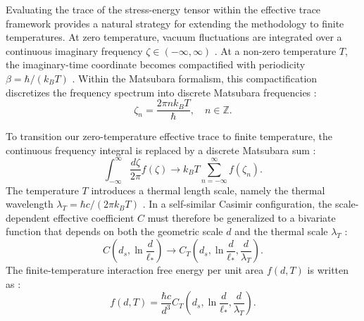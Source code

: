 \documentclass[12pt,letterpaper]{article}
\newcommand{\revision}[1]{#1}
\begin{document}
\revision{Evaluating the trace of the stress-energy tensor within the effective trace framework provides a natural strategy for extending the methodology to finite temperatures. At zero temperature, vacuum fluctuations are integrated over a continuous imaginary frequency $\zeta \in (-\infty, \infty)$ \cite{milton2016}. At a non-zero temperature $T$, the imaginary-time coordinate becomes compactified with periodicity $\beta = \hbar / (k_B T)$ \cite{bordag2009}. Within the Matsubara formalism, this compactification discretizes the frequency spectrum into discrete Matsubara frequencies \cite{shajesh2016}:
\begin{equation}
\zeta_n = \frac{2\pi n k_B T}{\hbar}, \quad n \in \mathbb{Z}.
\label{eq:matsubara_frequencies}
\end{equation}

To transition our zero-temperature effective trace to finite temperature, the continuous frequency integral is replaced by a discrete Matsubara sum \cite{bordag2009}:
\begin{equation}
\int_{-\infty}^{\infty} \frac{d\zeta}{2\pi} f(\zeta) \to k_B T \sum_{n=-\infty}^{\infty} f(\zeta_n).
\label{eq:matsubara_summation}
\end{equation}
The temperature $T$ introduces a thermal length scale, namely the thermal wavelength $\lambda_T = \hbar c / (2\pi k_B T)$ \cite{bordag2009}. In a self-similar Casimir configuration, the scale-dependent effective coefficient $C$ must therefore be generalized to a bivariate function that depends on both the geometric scale $d$ and the thermal scale $\lambda_T$ \cite{milton2004delta}:
\begin{equation}
C\left(d_s, \ln\frac{d}{\ell_*}\right) \to C_T\left(d_s, \ln\frac{d}{\ell_*}, \frac{d}{\lambda_T}\right).
\label{eq:running_coefficient_thermal}
\end{equation}
The finite-temperature interaction free energy per unit area $f(d, T)$ is written as \cite{milton2004delta}:
\begin{equation}
f(d, T) = \frac{\hbar c}{d^3} C_T\left(d_s, \ln\frac{d}{\ell_*}, \frac{d}{\lambda_T}\right).
\label{eq:free_energy_thermal}
\end{equation}

}
\end{document}
